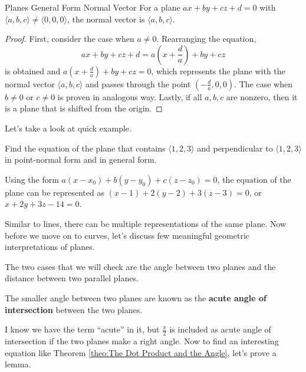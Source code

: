 \documentclass[../../../main.tex]{subfiles}
\begin{document}
\begin{theorem}{}{Planes General Form Normal Vector}
For a plane $ax + by + cz + d = 0$ with $\langle a, b, c \rangle
\neq \langle 0, 0, 0 \rangle$, the normal vector is
$\langle a, b, c \rangle$.
\end{theorem}
\begin{proof}
First, consider the case when $a \neq 0$. Rearranging the equation,
\[
ax + by + cz + d
= a \left( x + \frac{d}{a} \right) + by + cz
\]
is obtained and $a \left( x + \frac{d}{a} \right) + by + cz = 0$,
which represents the plane with the normal vector
$\langle a, b, c \rangle$ and passes through the point
$(-\frac{d}{a}, 0, 0)$. The case when $b \neq 0$ or $c \neq 0$
is proven in analogous way. Lastly, if all $a, b, c$ are nonzero,
then it is a plane that is shifted from the origin.
\end{proof}

Let's take a look at quick example.

\begin{problem}{}{}
Find the equation of the plane that contains $\langle 1, 2, 3 \rangle$
and perpendicular to $\langle 1, 2, 3 \rangle$ in point-normal form
and in general form.
\end{problem}
\begin{solution}
Using the form $a(x - x_0) + b(y - y_0) + c(z - z_0) = 0$,
the equation of the plane can be represented as
$(x - 1) + 2(y - 2) + 3(z - 3) = 0$, or $x + 2y + 3z - 14 = 0$.
\end{solution}

Similar to lines, there can be multiple representations of the
same plane. Now before we move on to curves, let's discuss few
meaningful geometric interpretations of planes.

The two cases that we will check are the angle between two planes
and the distance between two parallel planes.

\begin{definition}{}{}
The smaller angle between two planes are known as the \textbf{acute
angle of intersection} between the two planes.
\end{definition}

I know we have the term ``acute'' in it, but $\frac{\pi}{2}$ is
included as acute angle of intersection if the two planes make
a right angle. Now to find an interesting equation like Theorem
\ref{theo:The Dot Product and the Angle}, let's prove a lemma.
\end{document}
